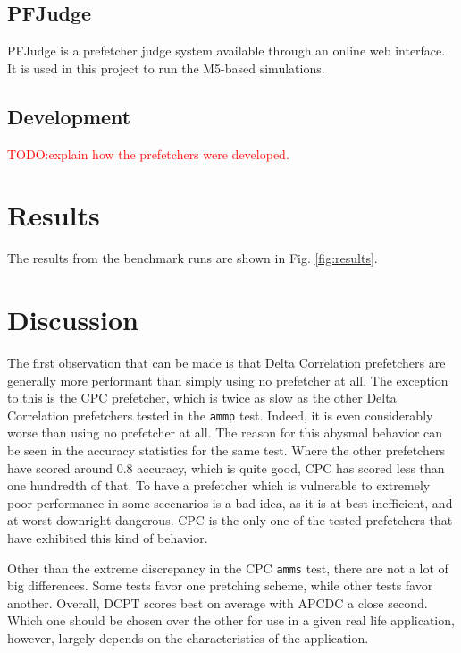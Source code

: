 \documentclass[a4paper]{IEEEtran}
\newcommand\TODO[1]{\textcolor{red}{TODO:#1}}
\newcommand\todo[1]{\TODO{#1}}
\begin{document}
\subsection{PFJudge}

PFJudge is a prefetcher judge system available through an online web interface.
It is used in this project to run the M5-based simulations.

\subsection{Development}

\todo{explain how the prefetchers were developed.}

\section{Results}

The results from the benchmark runs are shown in Fig. \ref{fig:results}.

\section{Discussion}

The first observation that can be made is that Delta Correlation prefetchers are generally more performant than simply using no prefetcher at all.
The exception to this is the CPC prefetcher, which is twice as slow as the other Delta Correlation prefetchers tested in the \texttt{ammp} test.
Indeed, it is even considerably worse than using no prefetcher at all.
The reason for this abysmal behavior can be seen in the accuracy statistics for the same test.
Where the other prefetchers have scored around 0.8 accuracy, which is quite good, CPC has scored less than one hundredth of that.
To have a prefetcher which is vulnerable to extremely poor performance in some secenarios is a bad idea, as it is at best inefficient, and at worst downright dangerous.
CPC is the only one of the tested prefetchers that have exhibited this kind of behavior.

Other than the extreme discrepancy in the CPC \texttt{amms} test, there are not a lot of big differences.
Some tests favor one pretching scheme, while other tests favor another.
Overall, DCPT scores best on average with APCDC a close second.
Which one should be chosen over the other for use in a given real life application, however, largely depends on the characteristics of the application.


\end{document}

